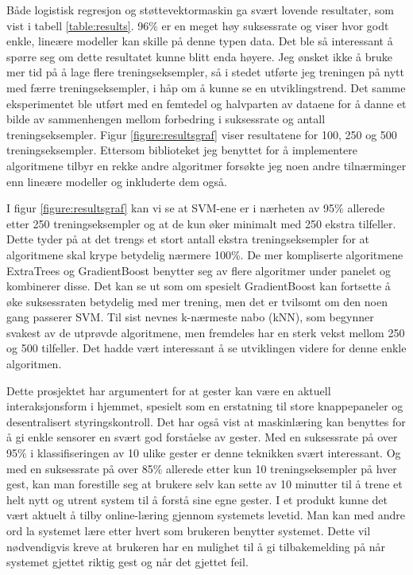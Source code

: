Både logistisk regresjon og støttevektormaskin ga svært lovende resultater, som vist i tabell \ref{table:results}. 96\% er en meget høy suksessrate og viser hvor godt enkle, lineære modeller kan skille på denne typen data. Det ble så interessant å spørre seg om dette resultatet kunne blitt enda høyere. Jeg ønsket ikke å bruke mer tid på å lage flere treningseksempler, så i stedet utførte jeg treningen på nytt med færre treningseksempler, i håp om å kunne se en utviklingstrend. Det samme eksperimentet ble utført med en femtedel og halvparten av dataene for å danne et bilde av sammenhengen mellom forbedring i suksessrate og antall treningseksempler. Figur \ref{figure:resultsgraf} viser resultatene for 100, 250 og 500 treningseksempler. Ettersom biblioteket jeg benyttet for å implementere algoritmene tilbyr en rekke andre algoritmer forsøkte jeg noen andre tilnærminger enn lineære modeller og inkluderte dem også.

I figur \ref{figure:resultsgraf} kan vi se at SVM-ene er i nærheten av 95\% allerede etter 250 treningseksempler og at de kun øker minimalt med 250 ekstra tilfeller. Dette tyder på at det trengs et stort antall ekstra treningseksempler for at algoritmene skal krype betydelig nærmere 100\%. De mer kompliserte algoritmene ExtraTrees og GradientBoost benytter seg av flere algoritmer under panelet og kombinerer disse. Det kan se ut som om spesielt GradientBoost kan fortsette å øke suksessraten betydelig med mer trening, men det er tvilsomt om den noen gang passerer SVM. Til sist nevnes k-nærmeste nabo (kNN), som begynner svakest av de utprøvde algoritmene, men fremdeles har en sterk vekst mellom 250 og 500 tilfeller. Det hadde vært interessant å se utviklingen videre for denne enkle algoritmen.

Dette prosjektet har argumentert for at gester kan være en aktuell interaksjonsform i hjemmet, spesielt som en erstatning til store knappepaneler og desentralisert styringskontroll. Det har også vist at maskinlæring kan benyttes for å gi enkle sensorer en svært god forståelse av gester. Med en suksessrate på over 95\% i klassifiseringen av 10 ulike gester er denne teknikken svært interessant. Og med en suksessrate på over 85\% allerede etter kun 10 treningseksempler på hver gest, kan man forestille seg at brukere selv kan sette av 10 minutter til å trene et helt nytt og utrent system til å forstå sine egne gester. I et produkt kunne det vært aktuelt å tilby online-læring gjennom systemets levetid. Man kan med andre ord la systemet lære etter hvert som brukeren benytter systemet. Dette vil nødvendigvis kreve at brukeren har en mulighet til å gi tilbakemelding på når systemet gjettet riktig gest og når det gjettet feil.

